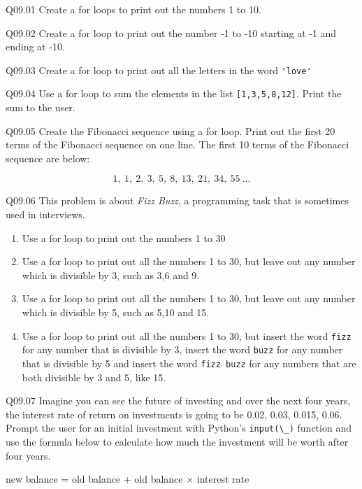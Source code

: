 \documentclass{book}
\newenvironment{problems}{}{}  %
\newcommand{\passthrough}[1]{#1}
\begin{document}
    
        \begin{problems}
        Q09.01 Create a for loops to print out the numbers 1 to 10.

Q09.02 Create a for loop to print out the number -1 to -10 starting at
-1 and ending at -10.

Q09.03 Create a for loop to print out all the letters in the word
\passthrough{\lstinline!'love'!}

Q09.04 Use a for loop to sum the elements in the list
\passthrough{\lstinline![1,3,5,8,12]!}. Print the sum to the user.

Q09.05 Create the Fibonacci sequence using a for loop. Print out the
first 20 terms of the Fibonacci sequence on one line. The first 10 terms
of the Fibonacci sequence are below:

\[ 1, \ 1, \ 2, \ 3, \ 5, \ 8, \ 13, \ 21, \ 34, \ 55 \ ... \]

Q09.06 This problem is about \emph{Fizz Buzz}, a programming task that
is sometimes used in interviews.

\begin{enumerate}
\def\labelenumi{(\alph{enumi})}
\item
  Use a for loop to print out the numbers 1 to 30
\item
  Use a for loop to print out all the numbers 1 to 30, but leave out any
  number which is divisible by 3, such as 3,6 and 9.
\item
  Use a for loop to print out all the numbers 1 to 30, but leave out any
  number which is divisible by 5, such as 5,10 and 15.
\item
  Use a for loop to print out all the numbers 1 to 30, but insert the
  word \passthrough{\lstinline!fizz!} for any number that is divisible
  by 3, insert the word \passthrough{\lstinline!buzz!} for any number
  that is divisible by 5 and insert the word
  \passthrough{\lstinline!fizz buzz!} for any numbers that are both
  divisible by 3 and 5, like 15.
\end{enumerate}

Q09.07 Imagine you can see the future of investing and over the next
four years, the interest rate of return on investments is going to be
0.02, 0.03, 0.015, 0.06. Prompt the user for an initial investment with
Python's \passthrough{\lstinline!input(\_)!} function and use the
formula below to calculate how much the investment will be worth after
four years.

new balance = old balance + old balance \(\times\) interest rate


\end{problems}
\end{document}
